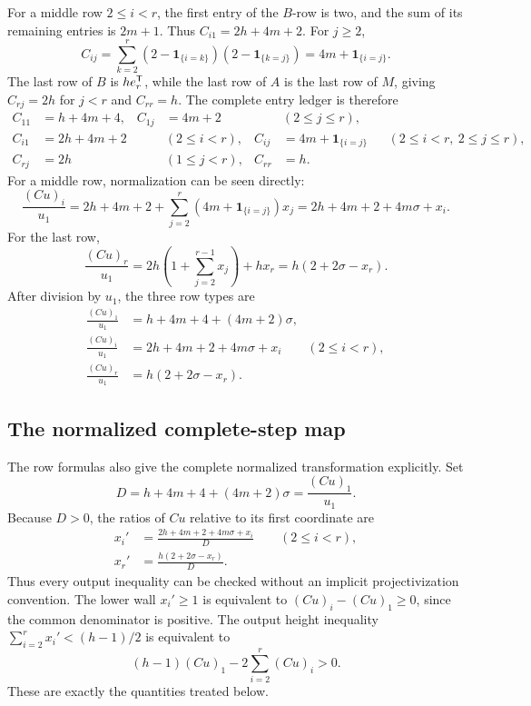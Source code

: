 \documentclass[11pt]{article}
\theoremstyle{remark}
\numberwithin{equation}{section}
\begin{document}
For a middle row \(2\leq i<r\), the first entry of the \(B\)-row is two,
and the sum of its remaining entries is \(2m+1\).  Thus
\(C_{i1}=2h+4m+2\).  For \(j\geq2\),
\[
C_{ij}
=\sum_{k=2}^{r}
(2-\mathbf1_{\{i=k\}})(2-\mathbf1_{\{k=j\}})
=4m+\mathbf1_{\{i=j\}}.
\]
The last row of \(B\) is \(he_r^{\mathsf{T}}\), while the last row of
\(A\) is the last row of \(M\), giving \(C_{rj}=2h\) for \(j<r\) and
\(C_{rr}=h\).  The complete entry ledger is therefore
\begin{equation}\label{eq:C-ledger}
\begin{aligned}
C_{11}&=h+4m+4,&
C_{1j}&=4m+2 &&(2\leq j\leq r),\\
C_{i1}&=2h+4m+2 &&(2\leq i<r),&
C_{ij}&=4m+\mathbf1_{\{i=j\}}
&&(2\leq i<r,\ 2\leq j\leq r),\\
C_{rj}&=2h &&(1\leq j<r),&
C_{rr}&=h.
\end{aligned}
\end{equation}
For a middle row, normalization can be seen directly:
\[
\frac{(Cu)_i}{u_1}
=2h+4m+2+
\sum_{j=2}^{r}(4m+\mathbf1_{\{i=j\}})x_j
=2h+4m+2+4m\sigma+x_i.
\]
For the last row,
\[
\frac{(Cu)_r}{u_1}
=2h\left(1+\sum_{j=2}^{r-1}x_j\right)+hx_r
=h(2+2\sigma-x_r).
\]
After division by \(u_1\), the three row types are
\begin{align}
\frac{(Cu)_1}{u_1}
&=h+4m+4+(4m+2)\sigma,
\label{eq:C-row-first}\\
\frac{(Cu)_i}{u_1}
&=2h+4m+2+4m\sigma+x_i
\qquad(2\leq i<r),
\label{eq:C-row-middle}\\
\frac{(Cu)_r}{u_1}
&=h(2+2\sigma-x_r).
\label{eq:C-row-last}
\end{align}

\subsection{The normalized complete-step map}

The row formulas also give the complete normalized transformation explicitly.
Set
\begin{equation}\label{eq:normalized-denominator}
D=h+4m+4+(4m+2)\sigma=\frac{(Cu)_1}{u_1}.
\end{equation}
Because \(D>0\), the ratios of \(Cu\) relative to its first coordinate are
\begin{align}
x_i'
&=\frac{2h+4m+2+4m\sigma+x_i}{D}
\qquad(2\leq i<r),
\label{eq:normalized-middle}\\
x_r'
&=\frac{h(2+2\sigma-x_r)}{D}.
\label{eq:normalized-last}
\end{align}
Thus every output inequality can be checked without an implicit
projectivization convention.  The lower wall \(x_i'\geq1\) is equivalent to
\((Cu)_i-(Cu)_1\geq0\), since the common denominator is positive.  The
output height inequality
\(\sum_{i=2}^{r}x_i'<(h-1)/2\) is equivalent to
\[
(h-1)(Cu)_1-2\sum_{i=2}^{r}(Cu)_i>0.
\]
These are exactly the quantities treated below.
\end{document}
